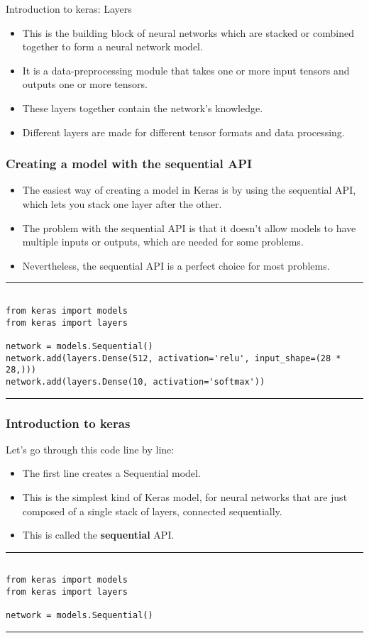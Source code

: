 \documentclass[11pt]{beamer}
\begin{document}
\begin{frame}{Introduction to keras: Layers}
	\begin{itemize}
		\item This is the building block of neural networks which are stacked or combined together to form a neural network model.
		\item It is a data-preprocessing module that takes one or more input tensors and outputs one or more tensors. 
		\item These layers together contain the network's knowledge. 
		\item Different layers are made for different tensor formats and data processing.
	\end{itemize}
\end{frame}
\begin{frame}[fragile]
\frametitle{Creating a model with the sequential API }
	\begin{itemize}
		\item The easiest way of creating a model in Keras is by using the sequential API, which lets you stack one layer after the other. 
		\item The problem with the sequential API is that it doesn't allow models to have multiple inputs or outputs, which are needed for some problems.
		\item Nevertheless, the sequential API is a perfect choice for most problems.
	\end{itemize}
\rule{\textwidth}{1pt}
\scriptsize
\begin{verbatim}

from keras import models
from keras import layers

network = models.Sequential()
network.add(layers.Dense(512, activation='relu', input_shape=(28 * 28,)))
network.add(layers.Dense(10, activation='softmax'))

\end{verbatim}
\rule{\textwidth}{1pt}
\end{frame}
\begin{frame}[fragile]
\frametitle{Introduction to keras}
Let’s go through this code line by line:
\begin{itemize}
\item The first line creates a Sequential model. 
\item This is the simplest kind of Keras model, for neural networks that are just composed of a single stack of layers, connected sequentially. 
\item This is called the \textbf{sequential} API.
\end{itemize}

\rule{\textwidth}{1pt}
\scriptsize
\begin{verbatim}

from keras import models
from keras import layers

network = models.Sequential()

\end{verbatim}
\rule{\textwidth}{1pt}
\end{frame}
\end{document}
